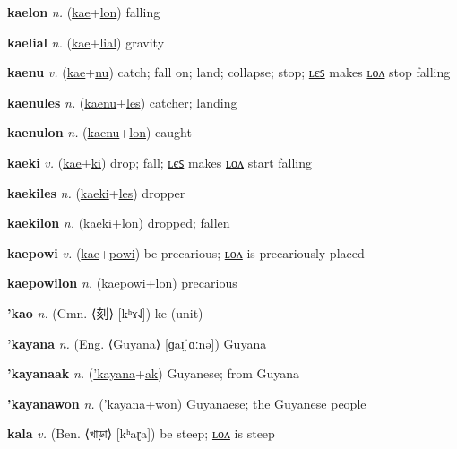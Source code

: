 \textbf{\hypertarget{kaelon}{kaelon}} \textit{n.} (\hyperlink{kae}{kae}+\allowbreak \hyperlink{lon}{lon})
falling

\textbf{\hypertarget{kaelial}{kaelial}} \textit{n.} (\hyperlink{kae}{kae}+\allowbreak \hyperlink{lial}{lial})
gravity

\textbf{\hypertarget{kaenu}{kaenu}} \textit{v.} (\hyperlink{kae}{kae}+\allowbreak \hyperlink{nu}{nu})
catch; fall on; land; collapse; stop; \hyperlink{kaenules}{ʟєꜱ} makes \hyperlink{kaenulon}{ʟᴏᴧ} stop falling

\textbf{\hypertarget{kaenules}{kaenules}} \textit{n.} (\hyperlink{kaenu}{kaenu}+\allowbreak \hyperlink{les}{les})
catcher; landing

\textbf{\hypertarget{kaenulon}{kaenulon}} \textit{n.} (\hyperlink{kaenu}{kaenu}+\allowbreak \hyperlink{lon}{lon})
caught

\textbf{\hypertarget{kaeki}{kaeki}} \textit{v.} (\hyperlink{kae}{kae}+\allowbreak \hyperlink{ki}{ki})
drop; fall; \hyperlink{kaekiles}{ʟєꜱ} makes \hyperlink{kaekilon}{ʟᴏᴧ} start falling

\textbf{\hypertarget{kaekiles}{kaekiles}} \textit{n.} (\hyperlink{kaeki}{kaeki}+\allowbreak \hyperlink{les}{les})
dropper

\textbf{\hypertarget{kaekilon}{kaekilon}} \textit{n.} (\hyperlink{kaeki}{kaeki}+\allowbreak \hyperlink{lon}{lon})
dropped; fallen

\textbf{\hypertarget{kaepowi}{kaepowi}} \textit{v.} (\hyperlink{kae}{kae}+\allowbreak \hyperlink{powi}{powi})
be precarious; \hyperlink{kaepowilon}{ʟᴏᴧ} is precariously placed

\textbf{\hypertarget{kaepowilon}{kaepowilon}} \textit{n.} (\hyperlink{kaepowi}{kaepowi}+\allowbreak \hyperlink{lon}{lon})
precarious

\textbf{\hypertarget{'kao}{'kao}} \textit{n.} (Cmn. ⟨{\chinese{}刻}⟩ [kʰɤ˨˩])
ke (unit)

\textbf{\hypertarget{'kayana}{'kayana}} \textit{n.} (Eng. ⟨Guyana⟩ [ɡaɪ̯ˈɑːnə])
Guyana

\textbf{\hypertarget{'kayanaak}{'kayanaak}} \textit{n.} (\hyperlink{'kayana}{'kayana}+\allowbreak \hyperlink{ak}{ak})
Guyanese; from Guyana

\textbf{\hypertarget{'kayanawon}{'kayanawon}} \textit{n.} (\hyperlink{'kayana}{'kayana}+\allowbreak \hyperlink{won}{won})
Guyanaese; the Guyanese people

\textbf{\hypertarget{kala}{kala}} \textit{v.} (Ben. ⟨{\bengali{}খাড়া}⟩ [kʰaɽa])
be steep; \hyperlink{kalalon}{ʟᴏᴧ} is steep

